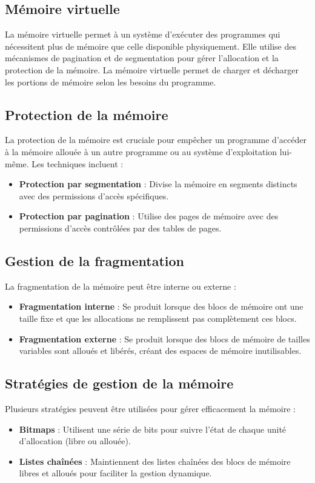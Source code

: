 \subsection{Mémoire virtuelle}
La mémoire virtuelle permet à un système d'exécuter des programmes qui nécessitent plus de mémoire que celle disponible physiquement. 
Elle utilise des mécanismes de pagination et de segmentation pour gérer l'allocation et la protection de la mémoire. 
La mémoire virtuelle permet de charger et décharger les portions de mémoire selon les besoins du programme.

\subsection{Protection de la mémoire}
La protection de la mémoire est cruciale pour empêcher un programme d'accéder à la mémoire allouée à un autre programme ou au système d'exploitation lui-même. Les techniques incluent :
\begin{itemize}
    \item \textbf{Protection par segmentation} : Divise la mémoire en segments distincts avec des permissions d'accès spécifiques.
    \item \textbf{Protection par pagination} : Utilise des pages de mémoire avec des permissions d'accès contrôlées par des tables de pages.
\end{itemize}

\subsection{Gestion de la fragmentation}
La fragmentation de la mémoire peut être interne ou externe :
\begin{itemize}
    \item \textbf{Fragmentation interne} : Se produit lorsque des blocs de mémoire ont une taille fixe et que les allocations ne remplissent pas complètement ces blocs.
    \item \textbf{Fragmentation externe} : Se produit lorsque des blocs de mémoire de tailles variables sont alloués et libérés, créant des espaces de mémoire inutilisables.
\end{itemize}

\subsection{Stratégies de gestion de la mémoire}
Plusieurs stratégies peuvent être utilisées pour gérer efficacement la mémoire :
\begin{itemize}
    \item \textbf{Bitmaps} : Utilisent une série de bits pour suivre l'état de chaque unité d'allocation (libre ou allouée).
    \item \textbf{Listes chaînées} : Maintiennent des listes chaînées des blocs de mémoire libres et alloués pour faciliter la gestion dynamique.
\end{itemize}


